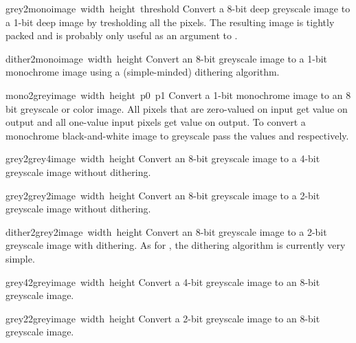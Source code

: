 \begin{funcdesc}{grey2mono}{image\, width\, height\, threshold}
Convert a 8-bit deep greyscale image to a 1-bit deep image by
tresholding all the pixels.  The resulting image is tightly packed and
is probably only useful as an argument to .
\end{funcdesc}

\begin{funcdesc}{dither2mono}{image\, width\, height}
Convert an 8-bit greyscale image to a 1-bit monochrome image using a
(simple-minded) dithering algorithm.
\end{funcdesc}

\begin{funcdesc}{mono2grey}{image\, width\, height\, p0\, p1}
Convert a 1-bit monochrome image to an 8 bit greyscale or color image.
All pixels that are zero-valued on input get value  on output
and all one-value input pixels get value  on output.  To
convert a monochrome black-and-white image to greyscale pass the
values  and  respectively.
\end{funcdesc}

\begin{funcdesc}{grey2grey4}{image\, width\, height}
Convert an 8-bit greyscale image to a 4-bit greyscale image without
dithering.
\end{funcdesc}

\begin{funcdesc}{grey2grey2}{image\, width\, height}
Convert an 8-bit greyscale image to a 2-bit greyscale image without
dithering.
\end{funcdesc}

\begin{funcdesc}{dither2grey2}{image\, width\, height}
Convert an 8-bit greyscale image to a 2-bit greyscale image with
dithering.  As for , the dithering algorithm is
currently very simple.
\end{funcdesc}

\begin{funcdesc}{grey42grey}{image\, width\, height}
Convert a 4-bit greyscale image to an 8-bit greyscale image.
\end{funcdesc}

\begin{funcdesc}{grey22grey}{image\, width\, height}
Convert a 2-bit greyscale image to an 8-bit greyscale image.
\end{funcdesc}
